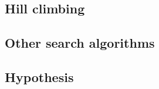 \documentclass{beamer}
\begin{document}
\subsection{Hill climbing}
\subsection{Other search algorithms}
\subsection{Hypothesis}
\end{document}
